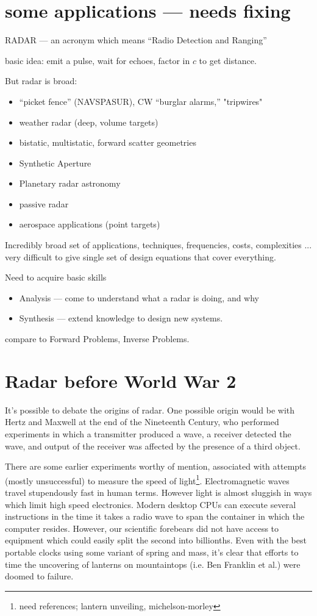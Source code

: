 \section{some applications --- needs fixing}

RADAR --- an acronym which means ``Radio Detection and Ranging''

basic idea: emit a pulse, wait for echoes, factor in $c$ to get
distance.

But radar is broad:
\begin{itemize}
\item ``picket fence'' (NAVSPASUR), CW ``burglar alarms,'' "tripwires"
\item weather radar (deep, volume targets)
\item bistatic, multistatic, forward scatter geometries
\item Synthetic Aperture
\item Planetary radar astronomy
\item passive radar
\item aerospace applications (point targets)
\end{itemize}
Incredibly broad set of applications, techniques, frequencies, costs,
complexities ... very difficult to give single set of design equations
that cover everything.

Need to acquire basic skills
\begin{itemize}
\item Analysis --- come to understand what a radar is doing, and why
\item Synthesis --- extend knowledge to design new systems.
\end{itemize}

compare to Forward Problems, Inverse Problems.

\section{Radar before World War 2}

It's possible to debate the origins of radar.  One possible origin
would be with Hertz and Maxwell at the end of the Nineteenth Century, 
who performed experiments in which a transmitter produced a wave, a 
receiver detected the wave, and output of the receiver was affected by the presence of a third object.

There are some earlier experiments worthy of mention, associated with
attempts (mostly unsuccessful) to measure the speed of light\footnote{need 
references; lantern unveiling, michelson-morley}.  Electromagnetic waves travel 
stupendously fast in human terms.  However light is almost sluggish in ways 
which limit high speed electronics.  Modern desktop CPUs can execute several 
instructions in the time it takes a radio wave to span the container in which the 
computer resides. However, our scientific forebears did not have access to equipment
which could easily split the second into billionths.  Even with the best
portable clocks using some variant of spring and mass, it's clear that
efforts to time the uncovering of lanterns on mountaintops (i.e. Ben
Franklin et al.) were doomed to failure.

